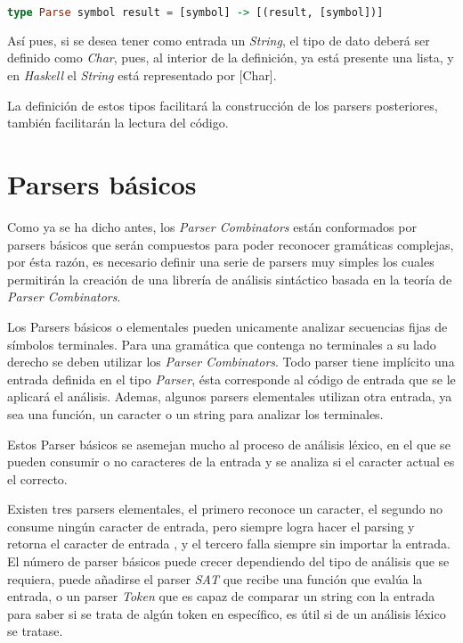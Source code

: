 \begin{lstlisting}[language=Haskell]
type Parse symbol result = [symbol] -> [(result, [symbol])]
\end{lstlisting}

Así pues, si se desea tener como entrada un \emph{String}, el tipo de dato deberá ser definido como \emph{Char}, pues, al interior de la definición, ya está presente una lista, y en \emph{Haskell} el \emph{String} está representado por [Char].

La definición de estos tipos facilitará la construcción de los parsers posteriores, también facilitarán la lectura del código.


\section{Parsers básicos}

Como ya se ha dicho antes, los \emph{Parser Combinators} están conformados por parsers básicos que serán compuestos para poder reconocer gramáticas complejas, por ésta razón, es necesario definir una serie de parsers muy simples los cuales permitirán la creación de una librería de análisis sintáctico basada en la teoría de \emph{Parser Combinators}. \cite{Jeuring2010,Hutton2007}

Los Parsers básicos o elementales pueden unicamente analizar secuencias fijas de símbolos terminales. Para una gramática que contenga no terminales a su lado derecho se deben utilizar los \emph{Parser Combinators}. \cite{Jeuring2010} Todo parser tiene implícito una entrada definida en el tipo \emph{Parser}, ésta corresponde al código de entrada que se le aplicará el análisis. Ademas, 
algunos parsers elementales utilizan otra entrada, ya sea una función, un caracter o un string para analizar los terminales.

Estos Parser básicos se asemejan mucho al proceso de análisis léxico, en el que se pueden consumir o no caracteres de la entrada y se analiza si el caracter actual es el correcto.

Existen tres parsers elementales, el primero reconoce un caracter, el segundo no consume ningún caracter de entrada, pero siempre logra hacer el parsing y retorna el caracter de entrada , y el tercero falla siempre sin importar la entrada. El número de parser básicos puede crecer dependiendo del tipo de análisis que se requiera, puede añadirse el parser \emph{SAT} que recibe una función que evalúa la entrada, o un parser \emph{Token} que es capaz de comparar un string con la entrada para saber si se trata de algún token en específico, es útil si de un análisis léxico se tratase.
 
